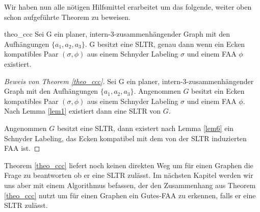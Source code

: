 Wir haben nun alle nötigen Hilfsmittel erarbeitet um das folgende, weiter oben schon aufgeführte Theorem zu beweisen.

\begin{reptheorem}{theo_ccc}
Sei G ein planer, intern-3-zusammenhängender Graph mit den Aufhängungen $\{a_1,a_2,a_3\}$. G besitzt eine SLTR, genau dann wenn ein Ecken kompatibles Paar $(\sigma,\phi)$ aus einem Schnyder Labeling $\sigma$ und einem FAA $\phi$ existiert.
\end{reptheorem}

\begin{proof}[Beweis von Theorem \ref{theo_ccc}]
Sei G ein planer, intern-3-zusammenhängender Graph mit den Aufhängungen $\{a_1,a_2,a_3\}$. Angenommen $G$ besitzt ein Ecken kompatibles Paar $(\sigma,\phi)$ aus einem Schnyder Labeling $\sigma$ und einem FAA $\phi$. Nach Lemma \ref{lem1} existiert dann eine SLTR von $G$. 

Angenommen $G$ besitzt eine SLTR, dann existert nach Lemma \ref{lem6} ein Schnyder Labeling, das Ecken kompatibel mit dem von der SLTR induzierten FAA ist.
\end{proof}

Theorem \ref{theo_ccc} liefert noch keinen direkten Weg um für einen Graphen die Frage zu beantworten ob er eine SLTR zulässt. Im nächsten Kapitel werden wir uns aber mit einem Algorithmus befassen, der den Zusammenhang aus Theorem \ref{theo_ccc} nutzt um für einen Graphen ein Gutes-FAA zu erkennen, falls er eine SLTR zulässt.





